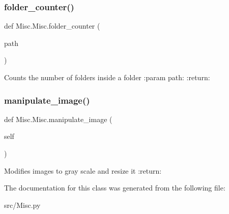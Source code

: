 \subsubsection{\texorpdfstring{folder\+\_\+counter()}{folder\_counter()}}
{\footnotesize\ttfamily def Misc.\+Misc.\+folder\+\_\+counter (\begin{DoxyParamCaption}\item[{}]{path }\end{DoxyParamCaption})\hspace{0.3cm}{\ttfamily [static]}}

\begin{DoxyVerb}Counts the number of folders inside a folder
:param path:
:return:
\end{DoxyVerb}
 \mbox{\label{class_misc_1_1_misc_aaeb87b754b9e7b39fcf5c39e6b34a1ae}} 
\subsubsection{\texorpdfstring{manipulate\+\_\+image()}{manipulate\_image()}}
{\footnotesize\ttfamily def Misc.\+Misc.\+manipulate\+\_\+image (\begin{DoxyParamCaption}\item[{}]{self }\end{DoxyParamCaption})}

\begin{DoxyVerb}Modifies images to gray scale and resize it
:return:
\end{DoxyVerb}
 

The documentation for this class was generated from the following file\+:\begin{DoxyCompactItemize}
\item 
src/Misc.\+py\end{DoxyCompactItemize}
